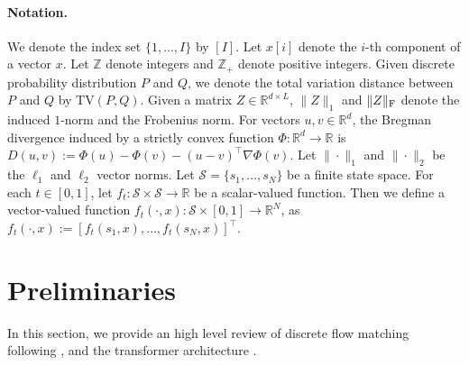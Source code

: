 \documentclass[12pt]{article}
\numberwithin{equation}{section}
\def\R{\mathbb{R}}
\let\cite\citep
\theoremstyle{theoremstyle}
\numberwithin{equation}{section}
\numberwithin{theorem}{section}
\numberwithin{proposition}{section}
\numberwithin{definition}{section}
\numberwithin{lemma}{section}
\numberwithin{assumption}{section}
\numberwithin{remark}{section}
\begin{document}
\paragraph{Notation.}
\label{sec:notation}
We denote the index set $\{1,\ldots,I\}$ by $[I]$.
Let $x[i]$ denote the $i$-th component of a vector $x$.
Let $\mathbb{Z}$ denote integers and $\mathbb{Z}_{+}$ denote positive integers.
Given discrete probability distribution $P$ and $Q$, we denote the total variation distance between $P$ and $Q$ by $\text{TV}(P, Q)$.
Given a matrix $Z \in \R^{d \times L}$, $\| Z \|_1$ and $\| Z \|_{\rm F}$ denote the induced $1$-norm and the Frobenius norm.
For vectors $u,v \in \mathbb{R}^d$, the Bregman divergence induced by a strictly convex function $\Phi:\mathbb{R}^d \rightarrow \mathbb{R}$ is
$D(u,v) := \Phi(u) - \Phi(v) - (u-v)^\top \nabla \Phi(v).$
Let $\|\cdot\|_1$ and $\|\cdot\|_2$ be the $\ell_1$ and $\ell_2$ vector norms. 
Let $\mathcal{S}=\{s_1,\ldots,s_N\}$ be a finite state space. For each $t \in [0,1]$, let $f_t: \mathcal{S} \times \mathcal{S} \rightarrow \mathbb{R}$ be a scalar-valued function. 
Then we define a vector-valued function $f_t(\cdot,x): \mathcal{S} \times [0,1] \rightarrow \mathbb{R}^N$, as
$f_t(\cdot,x) := [f_t(s_1, x), \ldots, f_t(s_N, x)]^\top.$



\section{Preliminaries}
\label{sec:preliminaries}

In this section, we provide an high level review of discrete flow matching following \cite{lipman2024flow}, and the transformer architecture \cite{vaswani2017attention}.
\end{document}
